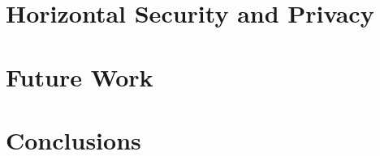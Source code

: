 \documentclass[sigconf, authordraft]{acmart}
\theoremstyle{mydef}
\begin{document}
\section{Horizontal Security and Privacy}
\label{sec:privacy}


\section{Future Work}
\label{sec:futurework}
\balance


\section{Conclusions}
\label{sec:conclusion}




\end{document}
